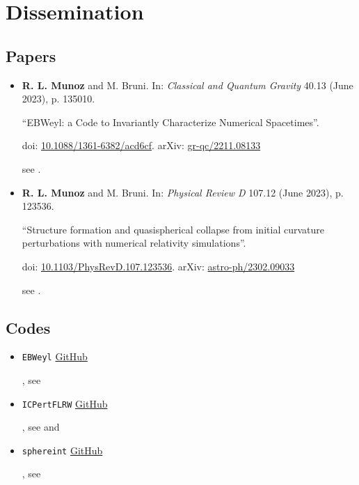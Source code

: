 \chapter{Dissemination}

\section{Papers}

\begin{itemize}[label=]
    \item \textbf{R. L. Munoz} and M. Bruni. 
    In: \textit{Classical and Quantum Gravity} 40.13 (June 2023), p. 135010.
    
    “EBWeyl: a Code to Invariantly Characterize Numerical Spacetimes”. 
    
    {\sc doi}: \href{https://doi.org/10.1088/1361-6382/acd6cf}{10.1088/1361-6382/acd6cf}.
    arXiv: \href{https://arxiv.org/abs/2211.08133}{gr-qc/2211.08133} 
    
    \autocite{R.L.Munoz_M.Bruni_2022} see .
    
    \item \textbf{R. L. Munoz} and M. Bruni.
    In: \textit{Physical Review D} 107.12 (June 2023), p. 123536. 
    
    “Structure formation and quasispherical collapse from initial curvature perturbations with numerical relativity simulations”. 
    
    {\sc doi}: \href{https://doi.org/10.1103/PhysRevD.107.123536}{10.1103/PhysRevD.107.123536}. 
    arXiv: \href{https://arxiv.org/abs/2302.09033}{astro-ph/2302.09033}
    
    \autocite{R.L.Munoz_M.Bruni_2023} see .
\end{itemize}

\section{Codes}

\begin{itemize}[label=]
    \item {\tt EBWeyl} \href{https://github.com/robynlm/ebweyl}{GitHub} 
    
    \autocite{R.L.Munoz_2022_EBWeyl, R.L.Munoz_M.Bruni_2022}, see 
    
    \item {\tt ICPertFLRW} \href{https://github.com/robynlm/ebweyl}{GitHub} 
    
    \autocite{R.L.Munoz_2023_ICPertFLRW, R.L.Munoz_M.Bruni_2023}, see  and 
    
    \item {\tt sphereint} \href{https://github.com/robynlm/sphereint}{GitHub} 
    
    \autocite{R.L.Munoz_2022_sphereint, R.L.Munoz_M.Bruni_2023}, see 
\end{itemize}